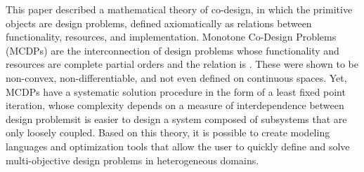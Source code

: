 This paper described a mathematical theory of co-design, in which
the primitive objects are design problems, defined axiomatically as
relations between functionality, resources, and implementation. Monotone
Co-Design Problems (MCDPs) are the interconnection of design problems
whose functionality and resources are complete partial orders and
the relation is \scottcontinuous. These were shown to be non-convex,
non-differentiable, and not even defined on continuous spaces. Yet,
MCDPs have a systematic solution procedure in the form of a least
fixed point iteration, whose complexity depends on a measure of interdependence
between design problems\textemdash it is easier to design a system
composed of subsystems that are only loosely coupled. Based on this
theory, it is possible to create modeling languages and optimization
tools that allow the user to quickly define and solve multi-objective
design problems in heterogeneous domains.






